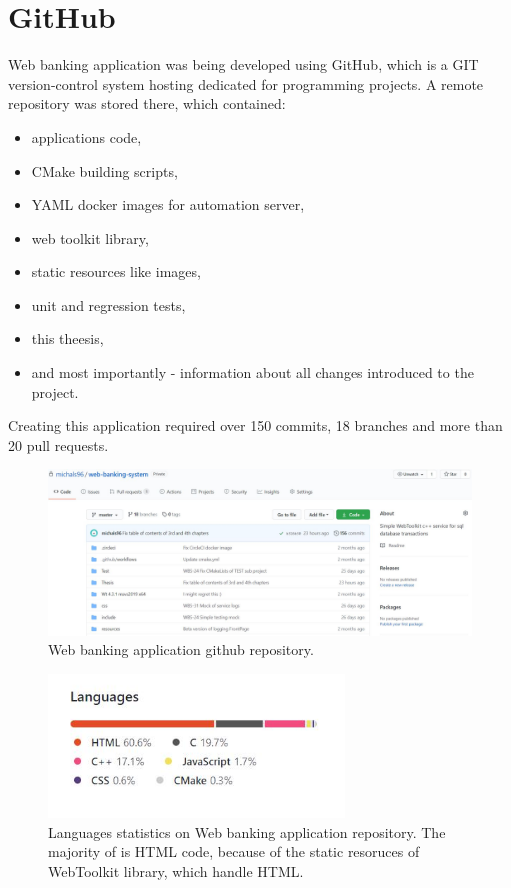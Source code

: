 \documentclass[a4paper,12pt]{book}
\newcommand\tab[1][1cm]{\hspace*{#1}}
\begin{document}
\section{GitHub}
{
\tab Web banking application was being developed using GitHub, which is a GIT version-control system hosting dedicated for programming projects. A remote repository was stored there, which contained:

\begin{itemize}
	\item applications code,
	\item CMake building scripts,
	\item YAML docker images for automation server,
	\item web toolkit library,
	\item static resources like images,
	\item unit and regression tests,
	\item this theesis,
	\item and most importantly - information about all changes introduced to the project.
\end{itemize}
	
\bigskip
Creating this application required over 150 commits, 18 branches and more than 20 pull requests.

\begin{figure}[H]
  \centering
    \includegraphics[width=1.0\textwidth]{repo}
    \caption{Web banking application github repository.~\cite{repo}}
\end{figure} 

\begin{figure}[H]
  \centering
    \includegraphics[width=0.7\textwidth]{languages}
    \caption{Languages statistics on Web banking application repository. The majority of is HTML code, because of the static resoruces of WebToolkit library, which handle HTML.~\cite{repo}}
\end{figure} 
    
}
\end{document}
